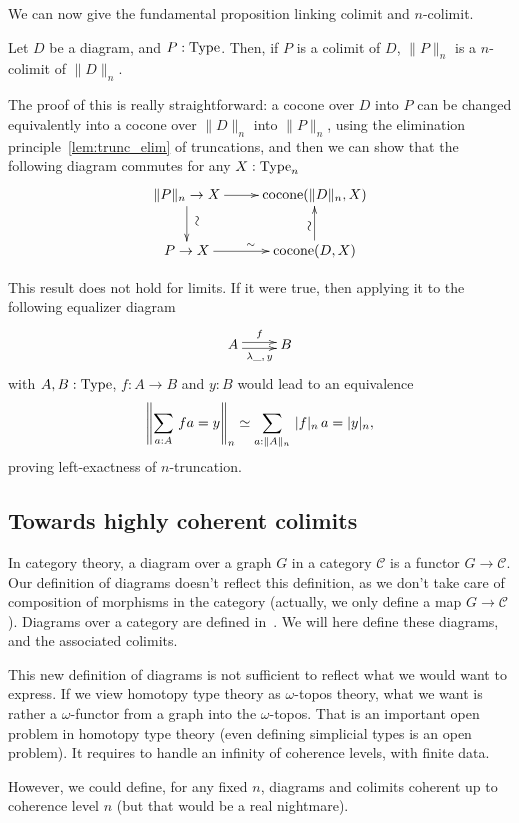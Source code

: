 We can now give the fundamental proposition linking colimit and
$n$-colimit.

\begin{prop}\label{prop:colimit-trunc}
  Let $D$ be a diagram, and $P:\operatorname{Type}$.
  Then, if $P$ is a colimit of $D$, $\|P\|_n$ is a $n$-colimit of $\|D\|_n$.
\end{prop}

The proof of this is really straightforward: a cocone over $D$ into
$P$ can be changed equivalently into a cocone over $\|D\|_n$ into $\|P\|_n$, using the
elimination principle~\ref{lem:trunc_elim} of truncations, and then
we can show that the following diagram commutes for any $X:\operatorname{Type}_n$
\[
  \xymatrix{
    \|P\|_n \to X \ar[r] \ar[d]^*[@]{\hbox to 0pt{\hss$\sim$\hss}} & \mathrm{cocone}(\|D\|_n,X) \\
    P \to X \ar[r]^\sim& \mathrm{cocone}(D,X) \ar[u]^*[@]{\hbox to 0pt{\hss$\sim$\hss}}
  }
\]

\begin{rmq}
This result does not hold for limits. If it were
true, then applying it to the following equalizer diagram
\[ \xymatrix{ A \ar@<-.5ex>[r]_{\lambda \_,\,y} \ar@<.5ex>[r]^f & B }\]
with $A,B:\operatorname{Type}$, $f:A\to B$ and $y:B$ would lead to an equivalence
\[ \left\| \sum_{a:A}\, f a = y \right\|_{n} \simeq \sum_{a:\|A\|_{n}}\, |f|_{n}\, a = |y|_{n}, \]
proving left-exactness of $n$-truncation.  
\end{rmq}

\subsection{Towards highly coherent colimits}
\label{ssec:high_colimit}

In category theory, a diagram over a graph $G$ in a category $\mathcal
C$ is a functor $G \to \mathcal C$. Our definition of diagrams doesn't
reflect this definition, as we don't take care of composition of
morphisms in the category (actually, we only define a map
$G\to\mathcal C$). Diagrams over a category are defined
in~\cite[Exercise 7.16]{hottbook}. We will here define these diagrams,
and the associated colimits.

\begin{rmq}
  This new definition of diagrams is not sufficient to reflect what we
  would want to express. If we view homotopy type theory as
  $\omega$-topos theory, what we want is rather a $\omega$-functor
  from a graph into the $\omega$-topos. That is an important open
  problem in homotopy type theory (even defining simplicial types is
  an open problem). It requires to handle an infinity of coherence
  levels, with finite data. 

  However, we could define, for any fixed $n$, diagrams and colimits
  coherent up to coherence level $n$ (but that would be a real nightmare).
\end{rmq}

